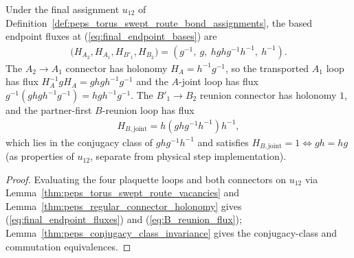 \begin{lemma}%
    \label{thm:peps_torus_swept_route_reunion_holonomy}
    \leanok
    Under the final assignment $u_{12}$ of Definition~\ref{def:peps_torus_swept_route_bond_assignments}, the based endpoint fluxes at (\ref{eq:final_endpoint_bases}) are
    \begin{align}
        \bigl(H_{A_2},H_{A_1},H_{B'_1},H_{B_2}\bigr) = (g^{-1},\ g,\ hghg^{-1}h^{-1},\ h^{-1}). \label{eq:final_endpoint_fluxes}
    \end{align}
    The $A_2\to A_1$ connector has holonomy $H_A=h^{-1}g^{-1}$, so the transported $A_1$ loop has flux $H_A^{-1}gH_A=ghgh^{-1}g^{-1}$ and the $A$-joint loop has flux $g^{-1}(ghgh^{-1}g^{-1})=hgh^{-1}g^{-1}$.
    The $B'_1\to B_2$ reunion connector has holonomy $1$, and the partner-first $B$-reunion loop has flux
    \begin{align}
        H_{B,\mathrm{joint}} = h(ghg^{-1}h^{-1})h^{-1}, \label{eq:B_reunion_flux}
    \end{align}
    which lies in the conjugacy class of $ghg^{-1}h^{-1}$ and satisfies $H_{B,\mathrm{joint}}=1\iff gh=hg$ (as properties of $u_{12}$, separate from physical step implementation).
\end{lemma}

\begin{proof}\leanok
    Evaluating the four plaquette loops and both connectors on $u_{12}$ via Lemma~\ref{thm:peps_torus_swept_route_vacancies} and Lemma~\ref{thm:peps_regular_connector_holonomy} gives (\ref{eq:final_endpoint_fluxes}) and (\ref{eq:B_reunion_flux}); Lemma~\ref{thm:peps_conjugacy_class_invariance} gives the conjugacy-class and commutation equivalences.
\end{proof}
